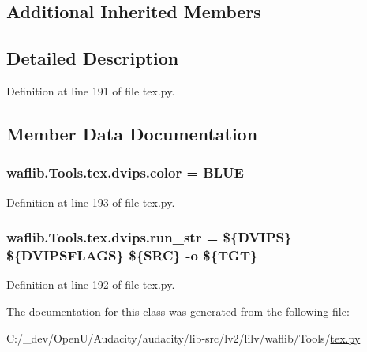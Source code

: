 \subsection*{Additional Inherited Members}


\subsection{Detailed Description}


Definition at line 191 of file tex.\+py.



\subsection{Member Data Documentation}
\subsubsection[{\texorpdfstring{color}{color}}]{ waflib.\+Tools.\+tex.\+dvips.\+color = \textquotesingle{}B\+L\+UE\textquotesingle{}\hspace{0.3cm}{\ttfamily [static]}}\hypertarget{classwaflib_1_1_tools_1_1tex_1_1dvips_a7d4aeecaf0cfdb4c53a6ec1823ca9dd0}{}\label{classwaflib_1_1_tools_1_1tex_1_1dvips_a7d4aeecaf0cfdb4c53a6ec1823ca9dd0}


Definition at line 193 of file tex.\+py.

\subsubsection[{\texorpdfstring{run\+\_\+str}{run_str}}]{ waflib.\+Tools.\+tex.\+dvips.\+run\+\_\+str = \textquotesingle{}\$\{D\+V\+I\+PS\} \$\{D\+V\+I\+P\+S\+F\+L\+A\+GS\} \$\{S\+RC\} -\/o \$\{T\+GT\}\textquotesingle{}\hspace{0.3cm}{\ttfamily [static]}}\hypertarget{classwaflib_1_1_tools_1_1tex_1_1dvips_a9aa6b5f344f9d83b8f4333634f3de1c5}{}\label{classwaflib_1_1_tools_1_1tex_1_1dvips_a9aa6b5f344f9d83b8f4333634f3de1c5}


Definition at line 192 of file tex.\+py.



The documentation for this class was generated from the following file\+:\begin{DoxyCompactItemize}
\item 
C\+:/\+\_\+dev/\+Open\+U/\+Audacity/audacity/lib-\/src/lv2/lilv/waflib/\+Tools/\hyperlink{lilv_2waflib_2_tools_2tex_8py}{tex.\+py}\end{DoxyCompactItemize}
